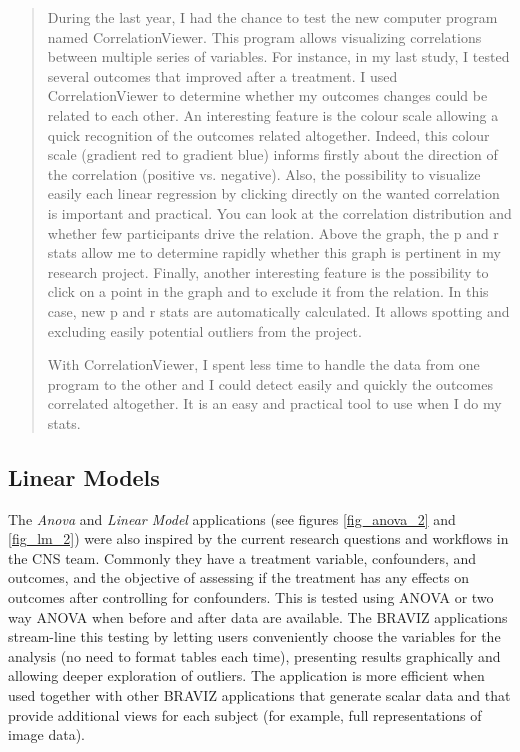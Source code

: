 \begin{quote}
During the last year, I had the chance to test the new computer program named CorrelationViewer. This program allows visualizing correlations between multiple series of variables. For instance, in my last study, I tested several outcomes that improved after a treatment. I used CorrelationViewer to determine whether my outcomes changes could be related to each other. An interesting feature is the colour scale allowing a quick recognition of the outcomes related altogether. Indeed, this colour scale (gradient red to gradient blue) informs firstly about the direction of the correlation (positive vs. negative). Also, the possibility to visualize easily each linear regression by clicking directly on the wanted correlation is important and practical. You can look at the correlation distribution and whether few participants drive the relation. Above the graph, the p and r stats allow me to determine rapidly whether this graph is pertinent in my research project. Finally, another interesting feature is the possibility to click on a point in the graph and to exclude it from the relation. In this case, new p and r stats are automatically calculated. It allows spotting and excluding easily potential outliers from the project.

With CorrelationViewer, I spent less time to handle the data from one program to the other and I could detect easily and quickly the outcomes correlated altogether. It is an easy and practical tool to use when I do my stats. 
\end{quote}

\subsection{Linear Models}

The \emph{Anova} and \emph{Linear Model} applications (see figures \ref{fig_anova_2} and \ref{fig_lm_2}) were also inspired by the current research questions and workflows in the CNS team. Commonly they have a treatment variable, confounders, and outcomes, and the objective of assessing if the treatment has any effects on outcomes after controlling for confounders. This is tested using ANOVA or two way ANOVA when before and after data are available. The BRAVIZ applications stream-line this testing by letting users conveniently choose the variables for the analysis (no need to format tables each time), presenting results graphically and allowing deeper exploration of outliers. The application is more efficient when used together with other BRAVIZ applications that generate scalar data and that provide additional views for each subject (for example, full representations of image data). 

